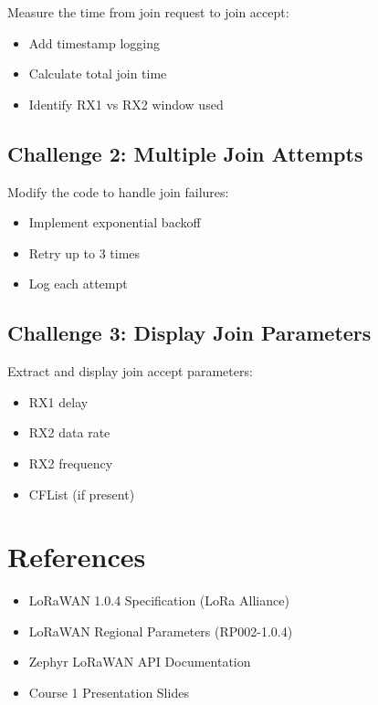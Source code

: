 \documentclass[11pt,a4paper]{article}
\begin{document}
Measure the time from join request to join accept:
\begin{itemize}
    \item Add timestamp logging
    \item Calculate total join time
    \item Identify RX1 vs RX2 window used
\end{itemize}

\subsection{Challenge 2: Multiple Join Attempts}

Modify the code to handle join failures:
\begin{itemize}
    \item Implement exponential backoff
    \item Retry up to 3 times
    \item Log each attempt
\end{itemize}

\subsection{Challenge 3: Display Join Parameters}

Extract and display join accept parameters:
\begin{itemize}
    \item RX1 delay
    \item RX2 data rate
    \item RX2 frequency
    \item CFList (if present)
\end{itemize}

\section{References}

\begin{itemize}
    \item LoRaWAN 1.0.4 Specification (LoRa Alliance)
    \item LoRaWAN Regional Parameters (RP002-1.0.4)
    \item Zephyr LoRaWAN API Documentation
    \item Course 1 Presentation Slides
\end{itemize}
\end{document}
